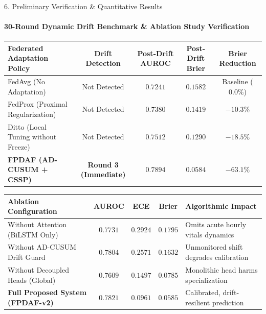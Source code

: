 \documentclass[aspectratio=169, 11pt]{beamer}
\begin{document}
\begin{frame}{6. Preliminary Verification \& Quantitative Results}
    \framesubtitle{30-Round Dynamic Drift Benchmark \& Ablation Study Verification}
    \vspace{-0.15cm}
    \begin{table}
        \centering
        \scriptsize
        \renewcommand{\arraystretch}{1.02}
        \begin{tabular}{l c c c c}
            \toprule
            \textbf{Federated Adaptation Policy} & \textbf{Drift Detection} & \textbf{Post-Drift AUROC} & \textbf{Post-Drift Brier} & \textbf{Brier Reduction} \\
            \midrule
            FedAvg (No Adaptation) & Not Detected & $0.7241$ & $0.1582$ & Baseline ($0.0\%$) \\
            FedProx (Proximal Regularization) & Not Detected & $0.7380$ & $0.1419$ & $-10.3\%$ \\
            Ditto (Local Tuning without Freeze) & Not Detected & $0.7512$ & $0.1290$ & $-18.5\%$ \\
            \midrule
            \textbf{\textcolor{amritaMaroon}{FPDAF (AD-CUSUM + CSSP)}} & \textbf{Round 3 (Immediate)} & $\mathbf{0.7894}$ & $\mathbf{0.0584}$ & $\mathbf{-63.1\%}$ \\
            \bottomrule
        \end{tabular}
    \end{table}
    \vspace{-0.25cm}

    \begin{table}
        \centering
        \scriptsize
        \renewcommand{\arraystretch}{1.00}
        \begin{tabular}{l c c c l}
            \toprule
            \textbf{Ablation Configuration} & \textbf{AUROC} & \textbf{ECE} & \textbf{Brier} & \textbf{Algorithmic Impact} \\
            \midrule
            Without Attention (BiLSTM Only) & $0.7731$ & $0.2924$ & $0.1795$ & Omits acute hourly vitals dynamics \\
            Without AD-CUSUM Drift Guard & $0.7804$ & $0.2571$ & $0.1632$ & Unmonitored shift degrades calibration \\
            Without Decoupled Heads (Global) & $0.7609$ & $0.1497$ & $0.0785$ & Monolithic head harms specialization \\
            \midrule
            \textbf{\textcolor{amritaMaroon}{Full Proposed System (FPDAF-v2)}} & $\mathbf{0.7821}$ & $\mathbf{0.0961}$ & $\mathbf{0.0585}$ & Calibrated, drift-resilient prediction \\
            \bottomrule
        \end{tabular}
    \end{table}
    \vspace{-0.15cm}


\end{frame}
\end{document}
